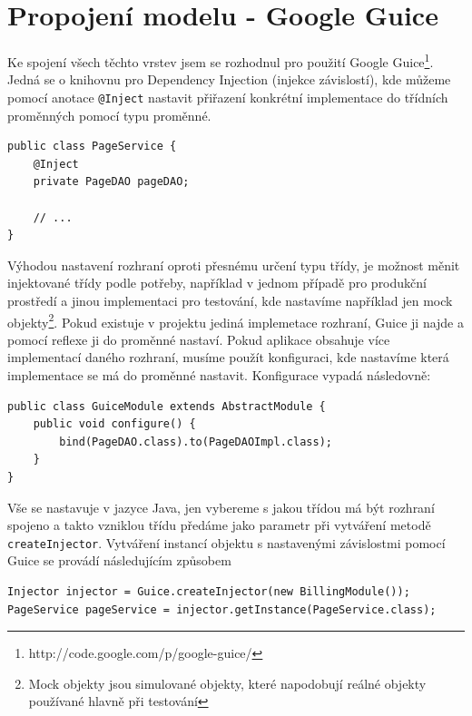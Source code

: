 \section{Propojení modelu - Google Guice}
Ke spojení všech těchto vrstev jsem se rozhodnul pro použití Google Guice\footnote{ http://code.google.com/p/google-guice/}. Jedná se o knihovnu pro Dependency Injection (injekce závislostí), kde můžeme pomocí anotace \verb|@Inject| nastavit přiřazení konkrétní implementace do třídních proměnných pomocí typu proměnné.

\begin{lstlisting}[caption={Ukázka použití Google Guice za pomocí anotace @Inject},label=lst:guiceInject,belowcaptionskip=0.4cm]
public class PageService {
	@Inject
	private PageDAO pageDAO;

	// ...
}
\end{lstlisting}

Výhodou nastavení rozhraní oproti přesnému určení typu třídy, je možnost měnit injektované třídy podle potřeby, například v jednom případě pro produkční prostředí a jinou implementaci pro testování, kde nastavíme například jen mock objekty\footnote{Mock objekty jsou simulované objekty, které napodobují reálné objekty používané hlavně při testování}. Pokud existuje v projektu jediná implemetace rozhraní, Guice ji najde a pomocí reflexe ji do proměnné nastaví. Pokud aplikace obsahuje více implementací daného rozhraní, musíme použít konfiguraci, kde nastavíme která implementace se má do proměnné nastavit. Konfigurace vypadá následovně:

\begin{lstlisting}[caption={Příklad konfigurace Google Guice},label=lst:guiceConfiguration,belowcaptionskip=0.4cm]
public class GuiceModule extends AbstractModule {
	public void configure() {
		bind(PageDAO.class).to(PageDAOImpl.class);
	}
}
\end{lstlisting}

Vše se nastavuje v jazyce Java, jen vybereme s jakou třídou má být rozhraní spojeno a takto vzniklou třídu předáme jako parametr při vytváření metodě \verb|createInjector|. Vytváření instancí objektu s nastavenými závislostmi pomocí Guice se provádí následujícím způsobem

\begin{lstlisting}[caption={Získávání sestavených tříd pomocí Google Guice},label=lst:guiceGetClass,belowcaptionskip=0.4cm]
Injector injector = Guice.createInjector(new BillingModule());
PageService pageService = injector.getInstance(PageService.class);
\end{lstlisting}

